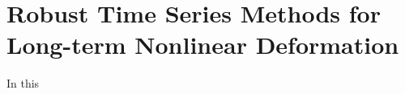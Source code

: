 


\chapter{Robust Time Series Methods for Long-term Nonlinear Deformation}
\label{CHAP:5-robust-ts}


In this 




